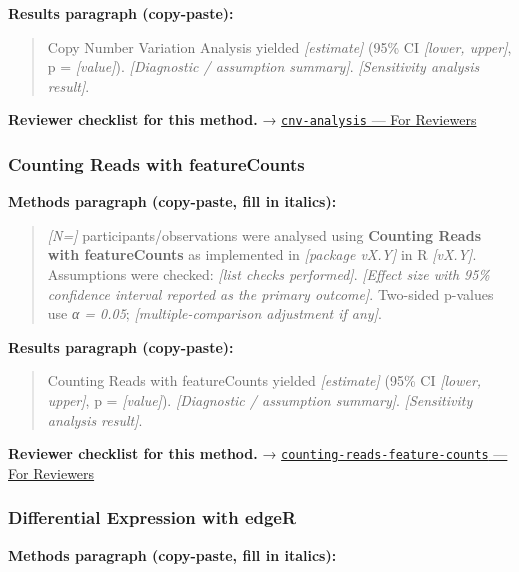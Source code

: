 \documentclass[
]{article}
\begin{document}
\textbf{Results paragraph (copy-paste):}

\begin{quote}
Copy Number Variation Analysis yielded \emph{{[}estimate{]}} (95\% CI
\emph{{[}lower, upper{]}}, p = \emph{{[}value{]}}). \emph{{[}Diagnostic
/ assumption summary{]}}. \emph{{[}Sensitivity analysis result{]}}.
\end{quote}

\textbf{Reviewer checklist for this method.} →
\href{../chapters/12-bioinformatics/cnv-analysis.Rmd\#for-reviewers}{\texttt{cnv-analysis}
--- For Reviewers}

\subsubsection{Counting Reads with
featureCounts}\label{counting-reads-with-featurecounts}

\textbf{Methods paragraph (copy-paste, fill in italics):}

\begin{quote}
\emph{{[}N={]}} participants/observations were analysed using
\textbf{Counting Reads with featureCounts} as implemented in
\emph{{[}package vX.Y{]}} in R \emph{{[}vX.Y{]}}. Assumptions were
checked: \emph{{[}list checks performed{]}}. \emph{{[}Effect size with
95\% confidence interval reported as the primary outcome{]}}. Two-sided
p-values use \emph{α = 0.05}; \emph{{[}multiple-comparison adjustment if
any{]}}.
\end{quote}

\textbf{Results paragraph (copy-paste):}

\begin{quote}
Counting Reads with featureCounts yielded \emph{{[}estimate{]}} (95\% CI
\emph{{[}lower, upper{]}}, p = \emph{{[}value{]}}). \emph{{[}Diagnostic
/ assumption summary{]}}. \emph{{[}Sensitivity analysis result{]}}.
\end{quote}

\textbf{Reviewer checklist for this method.} →
\href{../chapters/12-bioinformatics/counting-reads-feature-counts.Rmd\#for-reviewers}{\texttt{counting-reads-feature-counts}
--- For Reviewers}

\subsubsection{Differential Expression with
edgeR}\label{differential-expression-with-edger}

\textbf{Methods paragraph (copy-paste, fill in italics):}
\end{document}
